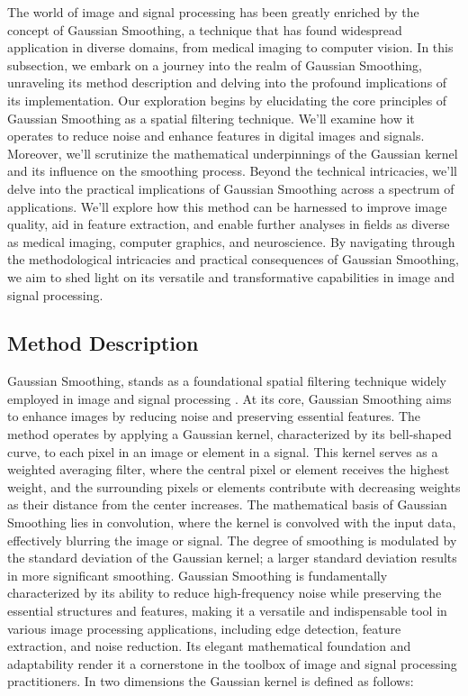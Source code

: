 The world of image and signal processing has been greatly enriched by the concept of Gaussian Smoothing, a technique that has found widespread application in diverse domains, from medical imaging to computer vision. In this subsection, we embark on a journey into the realm of Gaussian Smoothing, unraveling its method description and delving into the profound implications of its implementation. Our exploration begins by elucidating the core principles of Gaussian Smoothing as a spatial filtering technique. We'll examine how it operates to reduce noise and enhance features in digital images and signals. Moreover, we'll scrutinize the mathematical underpinnings of the Gaussian kernel and its influence on the smoothing process. Beyond the technical intricacies, we'll delve into the practical implications of Gaussian Smoothing across a spectrum of applications. We'll explore how this method can be harnessed to improve image quality, aid in feature extraction, and enable further analyses in fields as diverse as medical imaging, computer graphics, and neuroscience. By navigating through the methodological intricacies and practical consequences of Gaussian Smoothing, we aim to shed light on its versatile and transformative capabilities in image and signal processing.

\subsection{Method Description}

Gaussian Smoothing, stands as a foundational spatial filtering technique widely employed in image and signal processing \cite{garg2016quality}. At its core, Gaussian Smoothing aims to enhance images by reducing noise and preserving essential features. The method operates by applying a Gaussian kernel, characterized by its bell-shaped curve, to each pixel in an image or element in a signal. This kernel serves as a weighted averaging filter, where the central pixel or element receives the highest weight, and the surrounding pixels or elements contribute with decreasing weights as their distance from the center increases. The mathematical basis of Gaussian Smoothing lies in convolution, where the kernel is convolved with the input data, effectively blurring the image or signal. The degree of smoothing is modulated by the standard deviation of the Gaussian kernel; a larger standard deviation results in more significant smoothing. Gaussian Smoothing is fundamentally characterized by its ability to reduce high-frequency noise while preserving the essential structures and features, making it a versatile and indispensable tool in various image processing applications, including edge detection, feature extraction, and noise reduction. Its elegant mathematical foundation and adaptability render it a cornerstone in the toolbox of image and signal processing practitioners. In two dimensions the Gaussian kernel is defined as follows:

